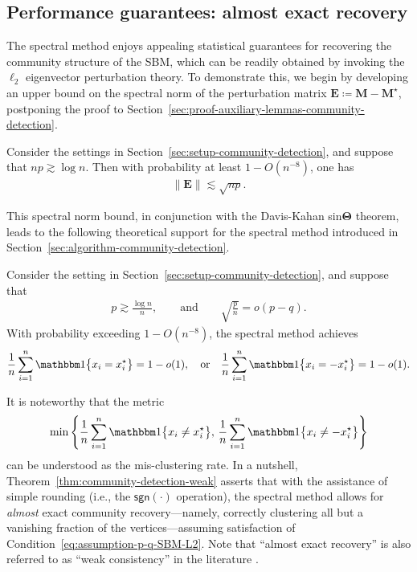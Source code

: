\subsection{Performance guarantees: almost exact recovery}
\label{sec:theory-community-detection}

The spectral method enjoys appealing statistical guarantees for recovering the community structure of the SBM, which can be readily obtained by invoking the $\ell_2$ eigenvector perturbation theory.  To demonstrate this, we begin by developing an upper bound on the spectral norm of the perturbation matrix $\bm{E}\coloneqq \bm{M} - \bm{M}^{\star}$,
postponing the proof to Section~\ref{sec:proof-auxiliary-lemmas-community-detection}.
%
\begin{lemma} \label{lemma:E-spectral-norm-SBM}
	Consider the settings in Section~\ref{sec:setup-community-detection}, and suppose that $np\gtrsim \log n$. Then with probability at least $1-O(n^{-8})$, one has
	\begin{align}
		\| \bm{E} \| \lesssim \sqrt{np} .
	\end{align}
\end{lemma}
%
This spectral norm bound, in conjunction with the Davis-Kahan sin$\bm{\Theta}$ theorem, leads to the following theoretical support for the spectral method introduced in Section~\ref{sec:algorithm-community-detection}.
%
\begin{theorem}
	\label{thm:community-detection-weak}
	Consider the setting in Section~\ref{sec:setup-community-detection}, and suppose that
	\begin{align}
		p \gtrsim\frac{\log n}{n}, 
		\qquad\text{and}\qquad \sqrt{\frac{p}{n}} =o(p-q).
		\label{eq:assumption-p-q-SBM-L2}
	\end{align}
	With probability exceeding $1-O(n^{-8})$, the spectral method achieves
	\begin{align*}
		\frac{1}{n}\sum_{i=1}^{n}\mathbbm1\big\{ x_{i} = x_{i}^{\star}\big\} = 1- o(1), 
		\quad \text{or} \quad
		\frac{1}{n}\sum_{i=1}^{n}\mathbbm1\big\{ x_{i} = - x_{i}^{\star}\big\} = 1- o(1) .
	\end{align*}
\end{theorem}
%
It is noteworthy that the metric
%
\[
	\min \Bigg\{  \frac{1}{n}\sum_{i=1}^{n}\mathbbm1\big\{ x_{i} \neq x_{i}^{\star}\big\},\, \frac{1}{n}\sum_{i=1}^{n}\mathbbm1\big\{ x_{i} \neq - x_{i}^{\star}\big\} \Bigg\}
\]
%
can be understood as the mis-clustering rate.
In a nutshell, Theorem~\ref{thm:community-detection-weak} asserts that with the assistance of simple rounding (i.e., the $\mathsf{sgn}(\cdot)$ operation), the spectral method allows for {\em almost} exact community recovery---namely, correctly clustering all but a vanishing fraction of the vertices---assuming satisfaction of Condition~\eqref{eq:assumption-p-q-SBM-L2}.  Note that ``almost exact recovery'' is also referred to as ``weak consistency'' in the literature \citep{abbe2017community}.


